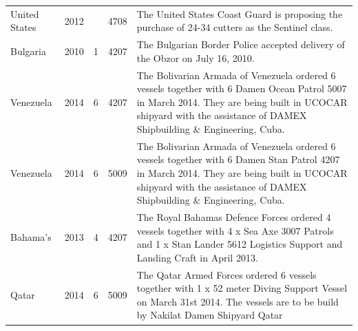 \documentclass{article}
\begin{document}
\begin{tabular}{lllll}
United States & 2012 &  & 4708 & The United States Coast Guard is proposing the purchase of 24-34 cutters as the Sentinel class. \\
Bulgaria & 2010 & 1 & 4207 & The Bulgarian Border Police accepted delivery of the Obzor on July 16, 2010. \\
Venezuela & 2014 & 6 & 4207 & The Bolivarian Armada of Venezuela ordered 6 vessels together with 6 Damen Ocean Patrol 5007 in March 2014. They are being built in UCOCAR shipyard with the assistance of DAMEX Shipbuilding \& Engineering, Cuba. \\
Venezuela & 2014 & 6 & 5009 & The Bolivarian Armada of Venezuela ordered 6 vessels together with 6 Damen Stan Patrol 4207 in March 2014. They are being built in UCOCAR shipyard with the assistance of DAMEX Shipbuilding \& Engineering, Cuba. \\
Bahama's & 2013 & 4 & 4207 & The Royal Bahamas Defence Forces ordered 4 vessels together with 4 x Sea Axe 3007 Patrols and 1 x Stan Lander 5612 Logistics Support and Landing Craft in April 2013. \\
Qatar & 2014 & 6 & 5009 & The Qatar Armed Forces ordered 6 vessels together with 1 x 52 meter Diving Support Vessel on March 31st 2014. The vessels are to be build by Nakilat Damen Shipyard Qatar \\
\bottomrule
\end{tabular}
\end{document}
